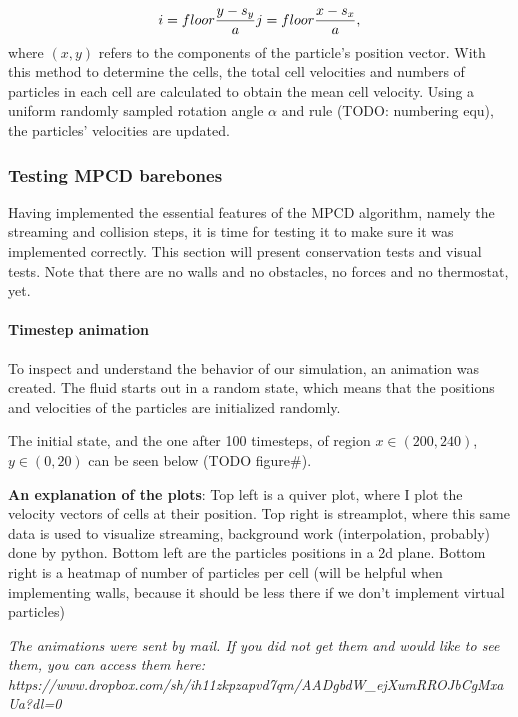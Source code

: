 \documentclass[
]{article}
\begin{document}
\begin{equation}
i = floor{\frac{y - s_y}{a}}\\
j = floor{\frac{x - s_x}{a}},
\end{equation} where \((x,y)\) refers to the components of the
particle's position vector. With this method to determine the cells, the
total cell velocities and numbers of particles in each cell are
calculated to obtain the mean cell velocity. Using a uniform randomly
sampled rotation angle \(\alpha\) and rule (TODO: numbering equ), the
particles' velocities are updated.

\hypertarget{testing-mpcd-barebones}{%
\subsubsection{Testing MPCD barebones}\label{testing-mpcd-barebones}}

Having implemented the essential features of the MPCD algorithm, namely
the streaming and collision steps, it is time for testing it to make
sure it was implemented correctly. This section will present
conservation tests and visual tests. Note that there are no walls and no
obstacles, no forces and no thermostat, yet.

\hypertarget{timestep-animation}{%
\paragraph{Timestep animation}\label{timestep-animation}}

To inspect and understand the behavior of our simulation, an animation
was created. The fluid starts out in a random state, which means that
the positions and velocities of the particles are initialized randomly.

The initial state, and the one after 100 timesteps, of region
\(x \in (200, 240)\), \(y \in (0, 20)\) can be seen below (TODO
figure\#).

\textbf{An explanation of the plots}: Top left is a quiver plot, where I
plot the velocity vectors of cells at their position. Top right is
streamplot, where this same data is used to visualize streaming,
background work (interpolation, probably) done by python. Bottom left
are the particles positions in a 2d plane. Bottom right is a heatmap of
number of particles per cell (will be helpful when implementing walls,
because it should be less there if we don't implement virtual particles)

\emph{The animations were sent by mail. If you did not get them and
would like to see them, you can access them here:
https://www.dropbox.com/sh/ih11zkpzapvd7qm/AADgbdW\_ejXumRROJbCgMxaUa?dl=0}
\end{document}
